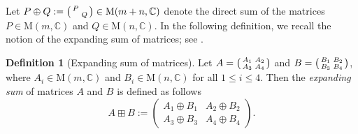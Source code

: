 \documentclass[11pt,reqno]{amsart}
\numberwithin{equation}{section}
\theoremstyle{definition}
\newtheorem{definition}[theorem]{Definition}
\def\C{\mathbb C}
\def\C{\mathbb {C}}
\begin{document}
Let $P \oplus Q:=\begin{psmallmatrix}
	P	& \\
	& Q
\end{psmallmatrix}  \in \mathrm{M}(m+n,\C)$ denote the direct sum of  the matrices $P \in \mathrm{M}(m,\C)$ and  $Q \in \mathrm{M}(n,\C)$. In the following definition, we recall the notion of the expanding sum of matrices; see \cite[page 385]{Cr}.
\begin{definition}[{Expanding sum of matrices}] \label{def-expanding-sum}
	Let $A=\begin{psmallmatrix}
		A_{1}	& A_{2}\\
		A_{3} & A_{4} 
	\end{psmallmatrix}$ and $B=\begin{psmallmatrix}
		B_{1}	& B_{2}\\
		B_{3} & B_{4} 
	\end{psmallmatrix}$, where $A_{i} \in \mathrm{M}(m,\C)$ and  $B_{i} \in \mathrm{M}(n,\C)$  for all $1\leq i \leq 4$. Then the \textit{expanding sum} of matrices $A$ and $B$ is defined as follows
	\begin{equation}\label{eq-expanding-sum}
		A \boxplus B :=  \begin{pmatrix}
			A_{1} \oplus B_{1}	& A_{2} \oplus B_{2}\\
			A_{3} \oplus B_{3} & A_{4} \oplus B_{4} 
		\end{pmatrix}.
	\end{equation}
\end{definition}
\end{document}
